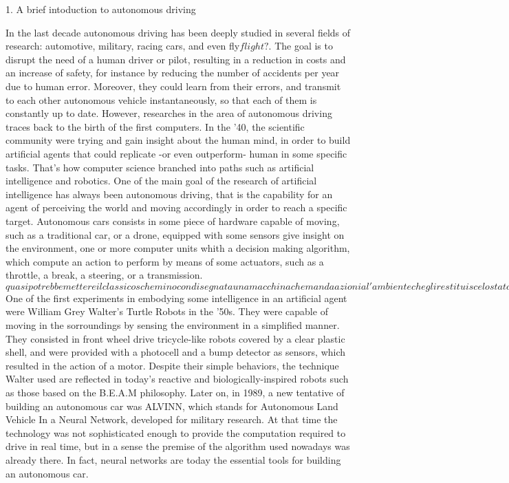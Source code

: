 1. A brief intoduction to autonomous driving

In the last decade autonomous driving has been deeply studied in several fields of research: automotive, military, racing cars, and even fly$flight ?$. The goal is to disrupt the need of a human driver or pilot, resulting in a reduction in costs and an increase of safety, for instance by reducing the number of accidents per year due to human error. Moreover, they could learn from their errors, and transmit to each other autonomous vehicle instantaneously, so that each of them is constantly up to date.
However, researches in the area of autonomous driving traces back to the birth of the first computers. In the '40, the scientific community were trying and gain insight about the human mind, in order to build artificial agents that could replicate -or even outperform- human in some specific tasks.
That's how computer science branched into paths such as artificial intelligence and robotics.
One of the main goal of the research of artificial intelligence has always been autonomous driving, that is the capability for an agent of perceiving the world and moving accordingly in order to reach a specific target.
Autonomous cars consists in some piece of hardware capable of moving, such as a traditional car, or a drone, equipped with some sensors give insight on the environment, one or more computer units whith a decision making algorithm, which compute an action to perform by means of some actuators, such as a throttle, a break, a steering, or a transmission.
$qua si potrebbe mettere il classico schemino con disegnata una macchina che manda azioni al'ambiente che gli restituisce lo stato?$
One of the first experiments in embodying some intelligence in an artificial agent were William Grey Walter's Turtle Robots in the '50s. They were capable of moving in the sorroundings by sensing the environment in a simplified manner. They consisted in front wheel drive tricycle-like robots covered by a clear plastic shell, and were provided with a photocell and a bump detector as sensors, which resulted in the action of a motor. Despite their simple behaviors, the technique Walter used are reflected in today's reactive and biologically-inspired robots such as those based on the B.E.A.M philosophy.
Later on, in 1989, a new tentative of building an autonomous car was ALVINN, which stands for Autonomous Land Vehicle In a Neural Network, developed for military research.
At that time the technology was not sophisticated enough to provide the computation required to drive in real time, but in a sense the premise of the algorithm used nowadays was already there. In fact, neural networks are today the essential tools for building an autonomous car.

